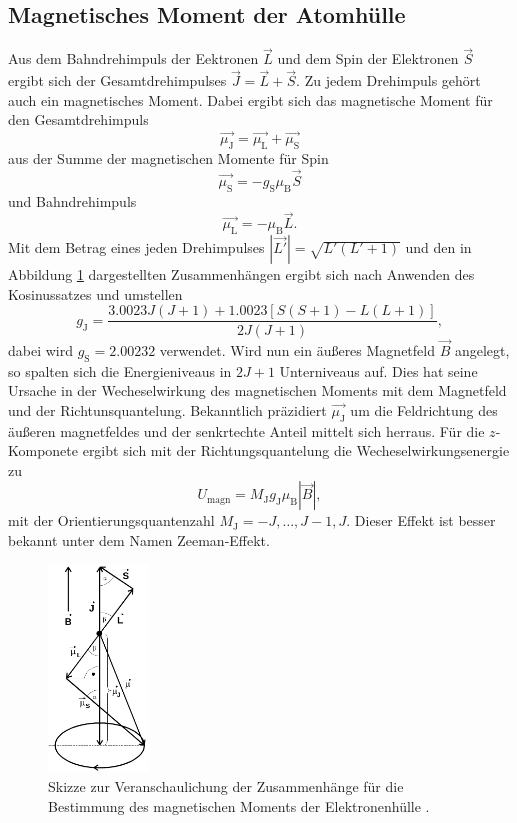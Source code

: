 \subsection{Magnetisches Moment der Atomhülle}
\label{sec:atomhülle}
Aus dem Bahndrehimpuls der Eektronen $\vec{L}$ und dem Spin der Elektronen $\vec{S}$ ergibt sich der
Gesamtdrehimpulses $\vec{J} = \vec{L} + \vec{S}$. Zu jedem Drehimpuls gehört auch ein magnetisches Moment.
Dabei ergibt sich das magnetische Moment für den Gesamtdrehimpuls 
\begin{equation*}
  \vec{\mu_\text{J}} = \vec{\mu_\text{L}} + \vec{\mu_\text{S}}
\end{equation*}
aus der Summe der magnetischen Momente für Spin 
\begin{equation}
\label{eqn:magspin}
  \vec{\mu_\text{S}} = -g_\text{S} \mu_\text{B} \vec{S}
\end{equation}
und Bahndrehimpuls
\begin{equation}
  \label{ean:magbahn}
  \vec{\mu_\text{L}} = - \mu_\text{B} \vec{L}.
\end{equation}
Mit dem Betrag eines jeden Drehimpulses $|\vec{L'}| = \sqrt{L' \left(L'+1\right)}$ und den
in Abbildung \ref{fig:magnmoment} dargestellten Zusammenhängen ergibt sich nach Anwenden des Kosinussatzes
und umstellen
\begin{equation}
  \label{eqn:gj}
  g_\text{J} = \frac{\num{3.0023}J(J+1)+\num{1.0023}[S(S+1)-L(L+1)]}{2J(J+1)},
\end{equation}
dabei wird $g_\text{S} = \num{2.00232}$ verwendet.
Wird nun ein äußeres Magnetfeld $\vec{B}$ angelegt, so spalten sich die Energieniveaus in $2J+1$ Unterniveaus auf.
Dies hat seine Ursache in der Wecheselwirkung des magnetischen Moments mit dem Magnetfeld und der Richtunsquantelung.
Bekanntlich präzidiert $\vec{\mu_\text{J}}$ um die Feldrichtung des äußeren magnetfeldes und der senkrtechte Anteil mittelt 
sich herraus. Für die $z$-Komponete ergibt sich mit der Richtungsquantelung die Wecheselwirkungsenergie zu
\begin{equation}
  \label{eqn:wwenergie}
  U_\text{magn} = M_\text{J} g_\text{J} \mu_\text{B} |\vec{B}|,
\end{equation}
mit der Orientierungsquantenzahl $M_\text{J} = -J, \ldots, J-1 ,J$. Dieser Effekt ist besser bekannt unter
dem Namen Zeeman-Effekt.
\begin{figure}
  \centering
  \includegraphics[height=5.5cm]{content/pictures/MagnMoment.png}
  \caption{Skizze zur Veranschaulichung der Zusammenhänge für die Bestimmung des magnetischen Moments der Elektronenhülle \cite{anleitung}.}
  \label{fig:magnmoment}
\end{figure}

